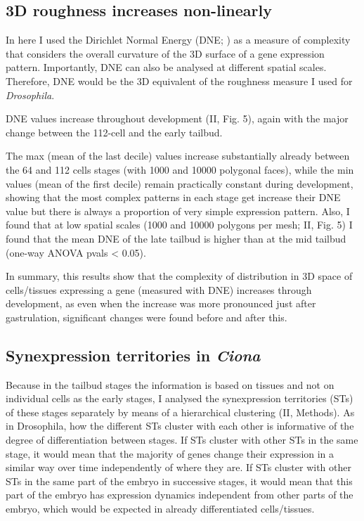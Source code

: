 \subsection{3D roughness increases non-linearly}
In here I used the Dirichlet Normal Energy (DNE; \citealp{Winchester2016}) as a measure of complexity that considers the overall curvature of the 3D surface of a gene expression pattern.
Importantly, DNE can also be analysed at different spatial scales. 
Therefore, DNE would be the 3D equivalent of the roughness measure I used for \textit{Drosophila}.

DNE values increase throughout development (II, Fig. 5), again with the major change between the 112-cell and the early tailbud. 

The max (mean of the last decile) values increase substantially already between the 64 and 112 cells stages (with 1000 and 10000 polygonal faces), while the min values (mean of the first decile) remain practically constant during development, showing that the most complex patterns in each stage get increase their DNE value but there is always a proportion of very simple expression pattern.
Also, I found that at low spatial scales (1000 and 10000 polygons per mesh; II, Fig. 5) I found that the mean DNE of the late tailbud is higher than at the mid tailbud (one-way ANOVA pvals < 0.05).

In summary, this results show that the complexity of distribution in 3D space of cells/tissues expressing a gene (measured with DNE) increases through development, as even when the increase was more pronounced just after gastrulation, significant changes were found before and after this.

\subsection{Synexpression territories in \textit{Ciona}}
Because in the tailbud stages the information is based on tissues and not on individual cells as the early stages, I analysed the synexpression territories (STs) of these stages separately by means of a hierarchical clustering (II, Methods). As in Drosophila, how the different STs cluster with each other is informative of the degree of differentiation between stages. If STs cluster with other STs in the same stage, it would mean that the majority of genes change their expression in a similar way over time independently of where they are. If STs cluster with other STs in the same part of the
embryo in successive stages, it would mean that this part of the embryo has expression dynamics independent from other parts of the embryo, which would be expected in already differentiated cells/tissues.

